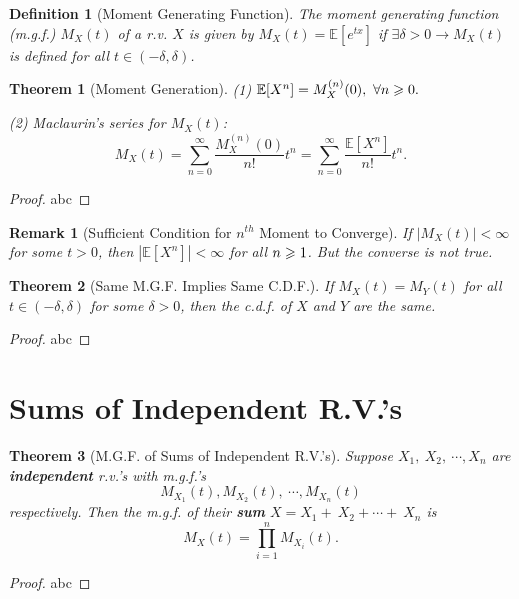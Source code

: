 \documentclass[openany,12pt]{book}
\newtheorem{theorem}{Theorem}[chapter]
\newtheorem{remark}{Remark}[chapter]
\newtheorem{definition}{Definition}[chapter]
\begin{document}
\begin{definition}[Moment Generating Function]
The moment generating function (m.g.f.) $M_{X}(t)$ of a r.v. $X$ is
given by
$M_{X}(t) = \mathbb{E}[ e^{tx}]$
if $\exists\delta > 0 \to M_{X}(t)$ is defined
for all $t \in ( - \delta,\delta)$.
\end{definition}

\begin{theorem}[Moment Generation]
(1)
$\mathbb{E}[X^{n}] = M_{X}^{\left( n \right)}(0),\ \forall n \gs 0.$

(2) Maclaurin's series for $M_{X}(t)$:
\[M_{X}(t) = \sum_{n = 0}^{\infty}\frac{M_{X}^{\left( n \right)}(0)}{n!}t^{n} = \sum_{n = 0}^{\infty}\frac{\mathbb{E}[X^{n}]}{n!}t^{n}.\]
\end{theorem}

\begin{proof}
  abc
\end{proof}

\begin{remark}[Sufficient Condition for $n^{th}$ Moment to Converge]
If $\left| M_{X}(t) \right| < \infty$ for some $t > 0$,
then $\left| \mathbb{E}[X^{n}] \right| < \infty$ for
all $n \geqslant 1$. But the converse is not true.
\end{remark}

\begin{theorem}[Same M.G.F. Implies Same C.D.F.]
If $M_{X}(t) = M_{Y}(t)$ for all
$t \in ( - \delta,\delta)$ for some $\delta > 0$, then the c.d.f. of $X$ and $Y$ are the same.
\end{theorem}

\begin{proof}
  abc
\end{proof}

\section{Sums of Independent R.V.'s}

\begin{theorem}[M.G.F. of Sums of Independent R.V.'s]
Suppose $X_{1},\ X_{2},\ \cdots,X_{n}$ are \textbf{independent} r.v.'s
with m.g.f.'s
\[M_{X_{1}}(t),M_{X_{2}}(t),\ \cdots,M_{X_{n}}(t)\] respectively. Then the m.g.f. of their \textbf{sum}
$X = X_{1} + \ X_{2} + \cdots + \ X_{n}$ is
\[M_{X}(t) = \prod_{i = 1}^{n}{M_{X_{i}}(t)}.\]
\end{theorem}

\begin{proof}
  abc
\end{proof}
\end{document}
